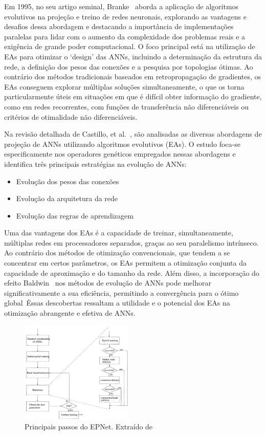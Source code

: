 Em 1995, no seu artigo seminal, Branke~\cite{Branke1995EvolutionaryTraining} aborda a aplicação de algoritmos evolutivos na projeção e treino de redes neuronais, explorando as vantagens e desafios dessa abordagem e destacando a importância de implementações paralelas para lidar com o aumento da complexidade dos problemas reais e a exigência de grande poder computacional.
O foco principal está na utilização de EAs para otimizar o ‘design’ das ANNs, incluindo a determinação da estrutura da rede, a definição dos pesos das conexões e a pesquisa por topologias ótimas.
Ao contrário dos métodos tradicionais baseados em retropropagação de gradientes, os EAs conseguem explorar múltiplas soluções simultaneamente, o que os torna particularmente úteis em situações em que é difícil obter informação do gradiente, como em redes recorrentes, com funções de transferência não diferenciáveis ou critérios de otimalidade não diferenciáveis.

Na revisão detalhada de Castillo, et al.~\cite{Castillo2003ArtificialAlgorithms}, são analisadas as diversas abordagens de projeção de ANNs utilizando algoritmos evolutivos (EAs).
O estudo foca-se especificamente nos operadores genéticos empregados nessas abordagens e identifica três principais estratégias na evolução de ANNs:
\begin{itemize}
    \item Evolução dos pesos das conexões
    \item Evolução da arquitetura da rede
    \item Evolução das regras de aprendizagem
\end{itemize}

Uma das vantagens dos EAs é a capacidade de treinar, simultaneamente, múltiplas redes em processadores separados, graças ao seu paralelismo intrínseco.
Ao contrário dos métodos de otimização convencionais, que tendem a se concentrar em certos parâmetros, os EAs permitem a otimização conjunta da capacidade de aproximação e do tamanho da rede.
Além disso, a incorporação do efeito Baldwin~\cite{Downing2010TheNetworks} nos métodos de evolução de ANNs pode melhorar significativamente a sua eficiência, permitindo a convergência para o ótimo global~\cite{Castillo2003ArtificialAlgorithms}\.
Essas descobertas ressaltam a utilidade e o potencial dos EAs na otimização abrangente e efetiva de ANNs.

\begin{figure}[htbp]
    \centering
    \includegraphics[width=0.48\textwidth]{imagens/evo_alg2}
    \caption{Principais passos do EPNet. Extraído de ~\cite{Yao1997ANetworks}}
    \label{fig:epnet}
\end{figure}

